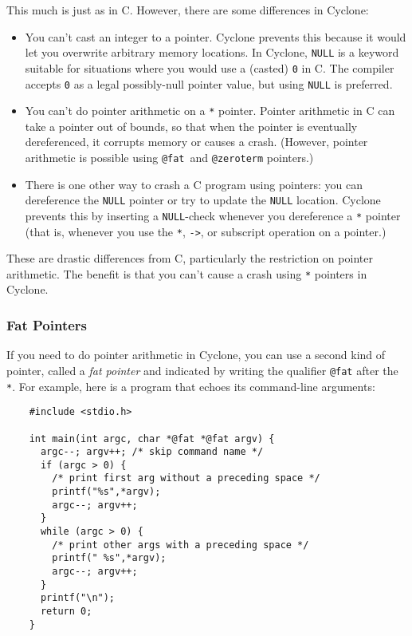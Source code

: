 This much is just as in C\@.  However, there are some differences in
Cyclone:
\begin{itemize}
\item You can't cast an integer to a pointer.  Cyclone prevents this
  because it would let you overwrite arbitrary memory locations.  In
  Cyclone, \texttt{NULL} is a keyword suitable for situations where
  you would use a (casted) \texttt{0} in C\@.  The compiler 
  accepts \texttt{0} as a legal possibly-null pointer value, but using
  \texttt{NULL} is preferred.
\item You can't do pointer arithmetic on a \texttt{*} pointer.
  Pointer arithmetic in C can take a pointer out of bounds, so that
  when the pointer is eventually dereferenced, it corrupts memory or
  causes a crash.  (However, pointer arithmetic is possible
  using \texttt{@fat}\ and \texttt{@zeroterm} pointers.)
\item There is one other way to crash a C program using pointers: you
  can dereference the \texttt{NULL} pointer or try to update the 
  \texttt{NULL} location.
  Cyclone prevents this by inserting a \texttt{NULL}-check whenever you
  dereference a \texttt{*} pointer (that is, whenever you use the
  \texttt{*}, \texttt{->}, or subscript operation on a pointer.)
\end{itemize}

These are drastic differences from C, particularly the restriction on
pointer arithmetic.  The benefit is that you can't cause a crash using
\texttt{*} pointers in Cyclone.

\subsubsection*{Fat Pointers}

If you need to do pointer arithmetic in Cyclone, you can use a second
kind of pointer, called a \emph{fat pointer} and indicated by 
writing the qualifier \texttt{@fat} after the \texttt{*}.  For
example, here is a program that echoes its command-line arguments:
\begin{verbatim}
    #include <stdio.h>

    int main(int argc, char *@fat *@fat argv) {
      argc--; argv++; /* skip command name */
      if (argc > 0) {
        /* print first arg without a preceding space */
        printf("%s",*argv);
        argc--; argv++;
      }
      while (argc > 0) {
        /* print other args with a preceding space */
        printf(" %s",*argv);
        argc--; argv++;
      }
      printf("\n");
      return 0;
    }
\end{verbatim}

